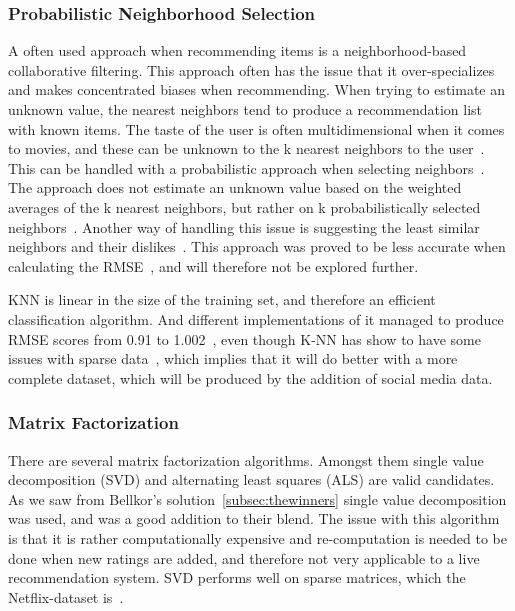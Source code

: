 \subsubsection{Probabilistic Neighborhood Selection}
A often used approach when recommending items is a neighborhood-based collaborative filtering. This approach often has the issue that it over-specializes and makes concentrated biases when recommending. When trying to estimate an unknown value, the nearest neighbors tend to produce a recommendation list with known items. The taste of the user is often multidimensional when it comes to movies, and these can be unknown to the k nearest neighbors to the user~\cite{umana}. This can be handled with a probabilistic approach when selecting neighbors~\cite{probcobfilter}. The approach does not estimate an unknown value based on the weighted averages of the k nearest neighbors, but rather on k probabilistically selected neighbors~\cite{optaplanner}. Another way of handling this issue is suggesting the least similar neighbors and their dislikes~\cite{furthestneighbor}. This approach was proved to be less accurate when calculating the RMSE~\cite{probcobfilter}, and will therefore not be explored further.

KNN is linear in the size of the training set, and therefore an efficient classification algorithm\cite{introtoIR}. And different implementations of it managed to produce RMSE scores from 0.91 to 1.002~\cite{knnnetflixstand, knnoldies, knnimpl, knncolbgroup}, even though K-NN has show to have some issues with sparse data~\cite{grobelnikDataSparsityIssues}, which implies that it will do better with a more complete dataset, which will be produced by the addition of social media data.


\subsubsection{Matrix Factorization}\label{subsubsec:matrixfac}
There are several matrix factorization algorithms. Amongst them single value decomposition (SVD) and alternating least squares (ALS) are valid candidates. As we saw from Bellkor's solution~\ref{subsec:thewinners} single value decomposition was used, and was a good addition to their blend. The issue with this algorithm is that it is rather computationally expensive and re-computation is needed to be done when new ratings are added, and therefore not very applicable to a live recommendation system. SVD performs well on sparse matrices, which the Netflix-dataset is~\cite{grobelnikDataSparsityIssues}.

